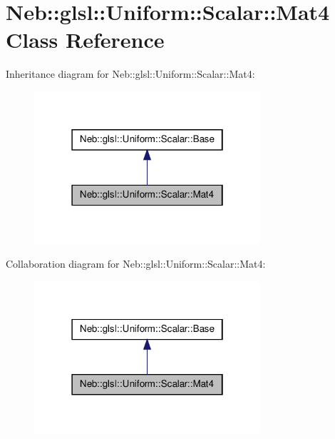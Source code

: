 \hypertarget{classNeb_1_1glsl_1_1Uniform_1_1Scalar_1_1Mat4}{\section{\-Neb\-:\-:glsl\-:\-:\-Uniform\-:\-:\-Scalar\-:\-:\-Mat4 \-Class \-Reference}
\label{classNeb_1_1glsl_1_1Uniform_1_1Scalar_1_1Mat4}
}


\-Inheritance diagram for \-Neb\-:\-:glsl\-:\-:\-Uniform\-:\-:\-Scalar\-:\-:\-Mat4\-:\nopagebreak
\begin{figure}[H]
\begin{center}
\leavevmode
\includegraphics[width=238pt]{classNeb_1_1glsl_1_1Uniform_1_1Scalar_1_1Mat4__inherit__graph}
\end{center}
\end{figure}


\-Collaboration diagram for \-Neb\-:\-:glsl\-:\-:\-Uniform\-:\-:\-Scalar\-:\-:\-Mat4\-:\nopagebreak
\begin{figure}[H]
\begin{center}
\leavevmode
\includegraphics[width=238pt]{classNeb_1_1glsl_1_1Uniform_1_1Scalar_1_1Mat4__coll__graph}
\end{center}
\end{figure}

